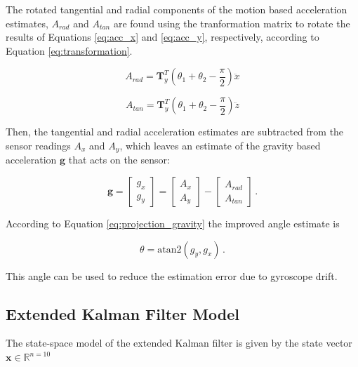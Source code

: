 \noindent
The rotated tangential and radial components of the motion based acceleration estimates, $A_{rad}$ and $A_{tan}$ are found using the tranformation matrix to rotate the results of Equations \ref{eq:acc_x} and \ref{eq:acc_y}, respectively, according to Equation \ref{eq:transformation}.

\begin{equation}
  A_{rad} = \mathbf{T}^T_y(\theta_1 + \theta_2 - \frac{\pi}{2}) \ddot{x}
\end{equation}

\begin{equation}
  A_{tan} = \mathbf{T}^T_y(\theta_1 + \theta_2 - \frac{\pi}{2}) \ddot{z}
\end{equation}

Then, the tangential and radial acceleration estimates are subtracted from the sensor readings $A_x$ and $A_y$, which leaves an estimate of the gravity based acceleration $\mathbf{g}$ that acts on the sensor:

\begin{equation}
\mathbf{g} = \begin{bmatrix}
    g_x \\
    g_y 
    \end{bmatrix} = 
    \begin{bmatrix}
    A_x \\
    A_y 
    \end{bmatrix} -
    \begin{bmatrix}
    A_{rad} \\
    A_{tan} 
    \end{bmatrix}\,.
\end{equation}

\noindent
According to Equation \ref{eq:projection_gravity} the improved angle estimate is

\begin{equation}
  \theta = \mbox{atan}2(g_y, g_x)\,.
\end{equation}

\noindent
This angle can be used to reduce the estimation error due to gyroscope drift.

\subsection{Extended Kalman Filter Model}

The state-space model of the extended Kalman filter is given by the state vector $\mathbf{x} \in \mathbb{R}^{n=10}$

